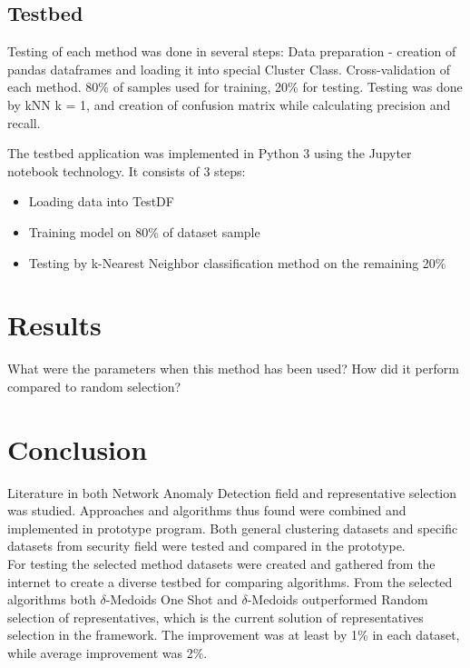 \documentclass[thesis=B,english]{FITthesis}[2012/10/20]
\begin{document}
\section{Testbed}
Testing of each method was done in several steps:
Data preparation - creation of pandas dataframes and loading it into special Cluster Class.
Cross-validation of each method. 80\% of samples used for training,  20\% for testing.
Testing was done by kNN k = 1, and creation of confusion matrix while calculating precision and recall.

The testbed application was implemented in Python 3 using the Jupyter notebook technology.
It consists of 3 steps:
\begin{itemize}
    \item Loading data into TestDF
    \item Training model on 80\% of dataset sample
    \item Testing by k-Nearest Neighbor classification method on the remaining 20\%
\end{itemize}

\chapter{Results}

What were the parameters when this method has been used?
How did it perform compared to random selection?


\chapter{Conclusion}
Literature in both Network Anomaly Detection field and representative selection was studied.
Approaches and algorithms thus found were combined and implemented in prototype program.
Both general clustering datasets and specific datasets from security field were tested and compared in the prototype. \\ 

For testing the selected method datasets were created and gathered from the internet to create a diverse testbed for comparing algorithms.
From the selected algorithms both $\delta$-Medoids One Shot and $\delta$-Medoids outperformed Random selection of representatives, which is the current solution of representatives selection in the framework.
The improvement was at least by 1\% in each dataset, while average improvement was 2\%.  \\
\end{document}
